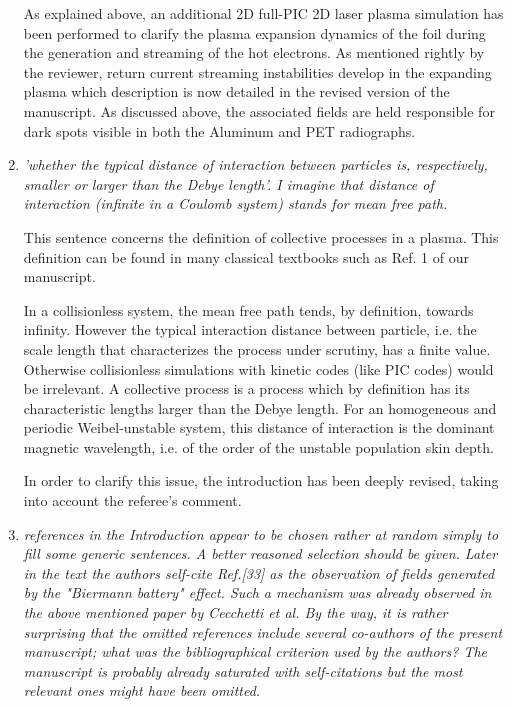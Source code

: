 \documentclass[aps,showpacs,superscriptaddress]{revtex4}%
\begin{document}
\begin{enumerate}
As explained above, an additional 2D full-PIC 2D laser plasma simulation has been performed to clarify the plasma expansion dynamics of the foil during the generation and streaming of the hot electrons. As mentioned rightly by the reviewer, return current streaming instabilities develop in the expanding plasma which description is now detailed in the revised version of the manuscript. As discussed above, the associated fields are held responsible for dark spots visible in both the Aluminum and PET radiographs.

\item \textit{'whether the typical distance of interaction between particles is, respectively, smaller or larger than the Debye length'. I imagine that distance of interaction (infinite in a Coulomb system) stands for mean free path. }

This sentence concerns the definition  of collective processes in a plasma. This definition can be found in many classical textbooks such as Ref. 1 of our manuscript. 

In a collisionless system, the mean free path tends,  by definition, towards infinity.
However the typical interaction distance between particle, i.e. the scale length that characterizes the process under scrutiny, has a finite value. Otherwise collisionless simulations with kinetic codes (like PIC codes) would be irrelevant. 
A collective process is a process which by definition  has its characteristic lengths larger than the Debye length.
For an homogeneous  and periodic Weibel-unstable system, this distance of interaction is  the dominant magnetic wavelength, i.e. of the order of the unstable population skin depth.

In order to clarify this issue, the introduction has been deeply revised, taking into account the referee's comment.

\item \textit{references in the Introduction appear to be chosen rather at random simply to fill some generic sentences. A better reasoned selection should be given. Later in the text the authors self-cite Ref.[33] as the observation of fields generated by the "Biermann battery" effect. Such a mechanism was already observed in the above mentioned paper by Cecchetti et al. By the way, it is rather surprising that the omitted references include several co-authors of the present manuscript; what was the bibliographical criterion used by the authors? The manuscript is probably already saturated with self-citations but the most relevant ones might have been omitted. }


\end{enumerate}
\end{document}
